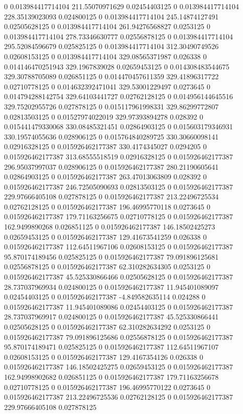 0 0.013984417714104 211.55070971629 0.02454403125
0 0.013984417714104 228.35139023093 0.024800125
0 0.013984417714104 245.14874127491 0.02505628125
0 0.013984417714104 261.94276568827 0.0253125
0 0.013984417714104 278.73346630777 0.02556878125
0 0.013984417714104 295.52084596679 0.025825125
0 0.013984417714104 312.30490749526 0.02608153125
0 0.013984417714104 329.08565371987 0.026338
0 0.014146470251943 329.1967839028 0.02659453125
0 0.014308483544675 329.30788705089 0.026851125
0 0.014470457611359 329.41896317722 0.02710778125
0 0.014632392471041 329.53001229497 0.0273645
0 0.014794288142754 329.64103441727 0.02762128125
0 0.014956144645516 329.75202955726 0.027878125
0 0.015117961998331 329.86299772807 0.02813503125
0 0.01527974022019 329.97393894278 0.028392
0 0.015441479330068 330.08485321451 0.02864903125
0 0.015603179346931 330.19574055636 0.028906125
0 0.015764840289725 330.30660098141 0.02916328125
0 0.015926462177387 330.4174345027 0.0294205
0 0.015926462177387 313.68555518519 0.02916328125
0 0.015926462177387 296.95037997037 0.028906125
0 0.015926462177387 280.21190605641 0.02864903125
0 0.015926462177387 263.47013063809 0.028392
0 0.015926462177387 246.72505090693 0.02813503125
0 0.015926462177387 229.97666405108 0.027878125
0 0.015926462177387 213.22496725534 0.02762128125
0 0.015926462177387 196.46995770118 0.0273645
0 0.015926462177387 179.71163256675 0.02710778125
0 0.015926462177387 162.9499890268 0.026851125
0 0.015926462177387 146.18502425273 0.02659453125
0 0.015926462177387 129.41673541259 0.026338
0 0.015926462177387 112.64511967106 0.02608153125
0 0.015926462177387 95.870174189456 0.025825125
0 0.015926462177387 79.091896125681 0.02556878125
0 0.015926462177387 62.310282634305 0.0253125
0 0.015926462177387 45.525330866466 0.02505628125
0 0.015926462177387 28.737037969934 0.024800125
0 0.015926462177387 11.945401089097 0.02454403125
0 0.015926462177387 -4.849582635114 0.024288
0 0.015926462177387 11.945401089086 0.02454403125
0 0.015926462177387 28.737037969917 0.024800125
0 0.015926462177387 45.525330866441 0.02505628125
0 0.015926462177387 62.310282634292 0.0253125
0 0.015926462177387 79.091896125686 0.02556878125
0 0.015926462177387 95.870174189471 0.025825125
0 0.015926462177387 112.64511967107 0.02608153125
0 0.015926462177387 129.4167354126 0.026338
0 0.015926462177387 146.18502425275 0.02659453125
0 0.015926462177387 162.94998902682 0.026851125
0 0.015926462177387 179.71163256678 0.02710778125
0 0.015926462177387 196.46995770122 0.0273645
0 0.015926462177387 213.22496725536 0.02762128125
0 0.015926462177387 229.97666405108 0.027878125
